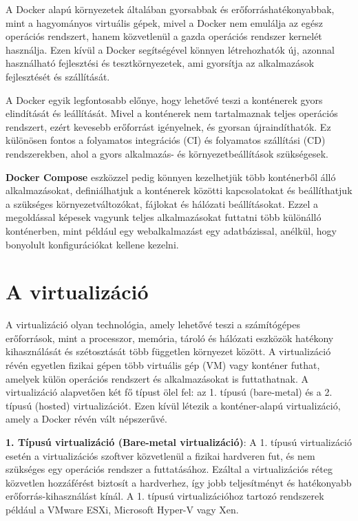 A Docker alapú környezetek általában gyorsabbak és erőforráshatékonyabbak, mint a hagyományos virtuális gépek, mivel a Docker nem emulálja az egész operációs rendszert, hanem közvetlenül a gazda operációs rendszer kernelét használja. Ezen kívül a Docker segítségével könnyen létrehozhatók új, azonnal használható fejlesztési és tesztkörnyezetek, ami gyorsítja az alkalmazások fejlesztését és szállítását.

A Docker egyik legfontosabb előnye, hogy lehetővé teszi a konténerek gyors elindítását és leállítását. Mivel a konténerek nem tartalmaznak teljes operációs rendszert, ezért kevesebb erőforrást igényelnek, és gyorsan újraindíthatók. Ez különösen fontos a folyamatos integrációs (CI) és folyamatos szállítási (CD) rendszerekben, ahol a gyors alkalmazás- és környezetbeállítások szükségesek.

\textbf{Docker Compose} eszközzel pedig könnyen kezelhetjük több konténerből álló alkalmazásokat, definiálhatjuk a konténerek közötti kapcsolatokat és beállíthatjuk a szükséges környezetváltozókat, fájlokat és hálózati beállításokat. Ezzel a megoldással képesek vagyunk teljes alkalmazásokat futtatni több különálló konténerben, mint például egy webalkalmazást egy adatbázissal, anélkül, hogy bonyolult konfigurációkat kellene kezelni.

\section{A virtualizáció}
A virtualizáció olyan technológia, amely lehetővé teszi a számítógépes erőforrások, mint a processzor, memória, tároló és hálózati eszközök hatékony kihasználását és szétosztását több független környezet között. A virtualizáció révén egyetlen fizikai gépen több virtuális gép (VM) vagy konténer futhat, amelyek külön operációs rendszert és alkalmazásokat is futtathatnak. A virtualizáció alapvetően két fő típust ölel fel: az 1. típusú (bare-metal) és a 2. típusú (hosted) virtualizációt. Ezen kívül létezik a konténer-alapú virtualizáció, amely a Docker révén vált népszerűvé.


\textbf{1. Típusú virtualizáció (Bare-metal virtualizáció)}: A 1. típusú virtualizáció esetén a virtualizációs szoftver közvetlenül a fizikai hardveren fut, és nem szükséges egy operációs rendszer a futtatásához. Ezáltal a virtualizációs réteg közvetlen hozzáférést biztosít a hardverhez, így jobb teljesítményt és hatékonyabb erőforrás-kihasználást kínál. A 1. típusú virtualizációhoz tartozó rendszerek például a VMware ESXi, Microsoft Hyper-V vagy Xen.

